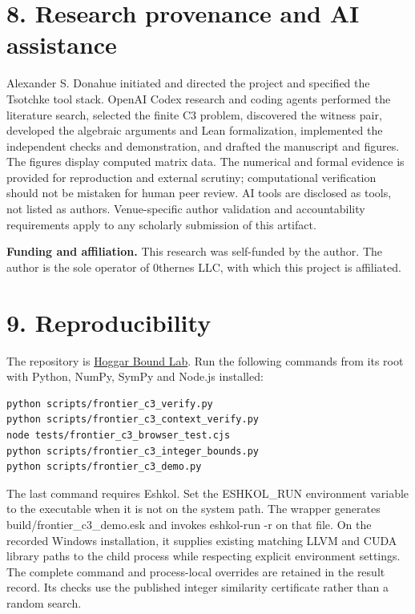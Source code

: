 \documentclass[11pt,letterpaper]{article}
\begin{document}
\section{8. Research provenance and AI assistance}\label{research-provenance-and-ai-assistance}

Alexander S. Donahue initiated and directed the project and specified the Tsotchke tool stack. OpenAI Codex research and coding agents performed the literature search, selected the finite C3 problem, discovered the witness pair, developed the algebraic arguments and Lean formalization, implemented the independent checks and demonstration, and drafted the manuscript and figures. The figures display computed matrix data. The numerical and formal evidence is provided for reproduction and external scrutiny; computational verification should not be mistaken for human peer review. AI tools are disclosed as tools, not listed as authors. Venue-specific author validation and accountability requirements apply to any scholarly submission of this artifact.

\textbf{Funding and affiliation.} This research was self-funded by the author. The author is the sole operator of 0thernes LLC, with which this project is affiliated.

\section{9. Reproducibility}\label{reproducibility}

The repository is \href{https://github.com/0thernes/hoggar-bound-lab}{Hoggar Bound Lab}. Run the following commands from its root with Python, NumPy, SymPy and Node.js installed:

\begin{samepage}\begin{verbatim}
python scripts/frontier_c3_verify.py
python scripts/frontier_c3_context_verify.py
node tests/frontier_c3_browser_test.cjs
python scripts/frontier_c3_integer_bounds.py
python scripts/frontier_c3_demo.py
\end{verbatim}\end{samepage}

The last command requires Eshkol. Set the ESHKOL\_RUN environment variable to the executable when it is not on the system path. The wrapper generates build/frontier\_c3\_demo.esk and invokes eshkol-run -r on that file. On the recorded Windows installation, it supplies existing matching LLVM and CUDA library paths to the child process while respecting explicit environment settings. The complete command and process-local overrides are retained in the result record. Its checks use the published integer similarity certificate rather than a random search.
\end{document}
